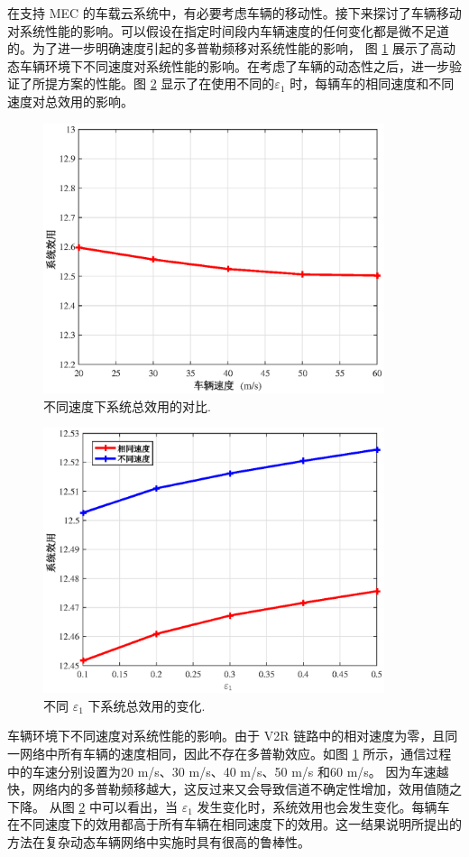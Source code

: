 在支持 MEC 的车载云系统中，有必要考虑车辆的移动性。接下来探讨了车辆移动对系统性能的影响。可以假设在指定时间段内车辆速度的任何变化都是微不足道的。为了进一步明确速度引起的多普勒频移对系统性能的影响，
图 \ref{F5} 展示了高动态车辆环境下不同速度对系统性能的影响。在考虑了车辆的动态性之后，进一步验证了所提方案的性能。图 \ref{F6} 显示了在使用不同的$\varepsilon_1$ 时，每辆车的相同速度和不同速度对总效用的影响。
\begin{figure}[H]
\centering
\includegraphics[width=10cm]{figures//chap3//diffspeed1.eps}
\caption{不同速度下系统总效用的对比.}
\label{F5}
\end{figure}
\begin{figure}[H]
\centering
\includegraphics[width=10cm]{figures//chap3//diff_e1.eps}
\caption{不同 $\varepsilon_1$ 下系统总效用的变化.}
\label{F6}
\end{figure}

车辆环境下不同速度对系统性能的影响。由于 V2R 链路中的相对速度为零，且同一网络中所有车辆的速度相同，因此不存在多普勒效应。如图 \ref{F5} 所示，通信过程中的车速分别设置为20 m/s、30 m/s、40 m/s、50 m/s 和60 m/s。 因为车速越快，网络内的多普勒频移越大，这反过来又会导致信道不确定性增加，效用值随之下降。
从图 \ref{F6} 中可以看出，当 $\varepsilon_1$ 发生变化时，系统效用也会发生变化。每辆车在不同速度下的效用都高于所有车辆在相同速度下的效用。这一结果说明所提出的方法在复杂动态车辆网络中实施时具有很高的鲁棒性。


